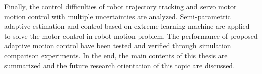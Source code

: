 \begin{englishabstract}
Finally, the control difficulties of robot trajectory tracking and servo motor motion control with multiple uncertainties are analyzed. Semi-parametric adaptive estimation and control based on extreme learning machine are applied to solve the motor control in robot motion problem. The performance of proposed adaptive motion control have been tested and verified through simulation comparison experiments. In the end, the main contents of this thesis are summarized and the future research orientation of this topic are discussed.
   

\end{englishabstract}
